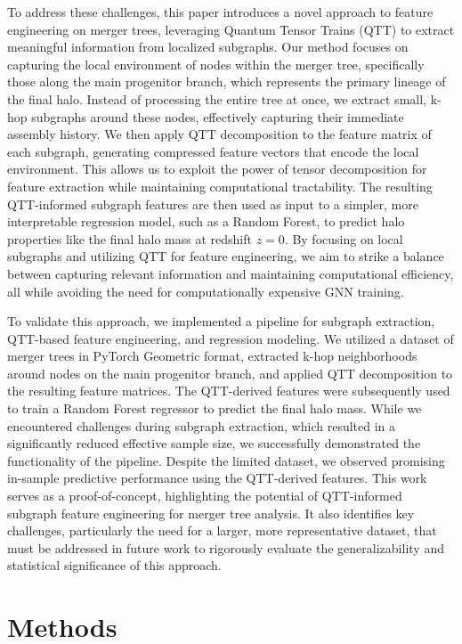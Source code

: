 \documentclass[twocolumn]{aastex631}
\begin{document}
To address these challenges, this paper introduces a novel approach to feature engineering on merger trees, leveraging Quantum Tensor Trains (QTT) to extract meaningful information from localized subgraphs. Our method focuses on capturing the local environment of nodes within the merger tree, specifically those along the main progenitor branch, which represents the primary lineage of the final halo. Instead of processing the entire tree at once, we extract small, k-hop subgraphs around these nodes, effectively capturing their immediate assembly history. We then apply QTT decomposition to the feature matrix of each subgraph, generating compressed feature vectors that encode the local environment. This allows us to exploit the power of tensor decomposition for feature extraction while maintaining computational tractability. The resulting QTT-informed subgraph features are then used as input to a simpler, more interpretable regression model, such as a Random Forest, to predict halo properties like the final halo mass at redshift \(z=0\). By focusing on local subgraphs and utilizing QTT for feature engineering, we aim to strike a balance between capturing relevant information and maintaining computational efficiency, all while avoiding the need for computationally expensive GNN training.

To validate this approach, we implemented a pipeline for subgraph extraction, QTT-based feature engineering, and regression modeling. We utilized a dataset of merger trees in PyTorch Geometric format, extracted k-hop neighborhoods around nodes on the main progenitor branch, and applied QTT decomposition to the resulting feature matrices. The QTT-derived features were subsequently used to train a Random Forest regressor to predict the final halo mass. While we encountered challenges during subgraph extraction, which resulted in a significantly reduced effective sample size, we successfully demonstrated the functionality of the pipeline. Despite the limited dataset, we observed promising in-sample predictive performance using the QTT-derived features. This work serves as a proof-of-concept, highlighting the potential of QTT-informed subgraph feature engineering for merger tree analysis. It also identifies key challenges, particularly the need for a larger, more representative dataset, that must be addressed in future work to rigorously evaluate the generalizability and statistical significance of this approach.


\section{Methods}
\label{sec:methods}
\end{document}
